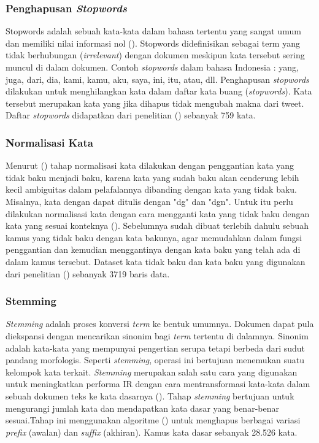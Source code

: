 \subsubsection*{Penghapusan \textit{Stopwords}}

Stopwords adalah sebuah kata-kata dalam bahasa tertentu yang sangat umum dan memiliki nilai informasi nol (\cite{Meyer2008}). Stopwords didefinisikan sebagai term yang tidak berhubungan (\textit{irrelevant}) dengan dokumen meskipun kata tersebut sering muncul di dalam dokumen. Contoh \textit{stopwords} dalam bahasa  Indonesia : yang, juga, dari, dia, kami, kamu, aku, saya, ini, itu, atau, dll.
Penghapusan \textit{stopwords} dilakukan untuk menghilangkan kata dalam daftar kata buang (\textit{stopwords}). Kata tersebut merupakan kata yang jika dihapus tidak mengubah makna dari tweet. Daftar \textit{stopwords} didapatkan dari penelitian \citeauthor{tala2003study} (\cite*{tala2003study}) sebanyak 759 kata.


\subsubsection*{Normalisasi Kata}

Menurut \citeauthor{AZIZ2013} (\cite*{AZIZ2013}) tahap normalisasi kata dilakukan dengan penggantian kata yang tidak baku menjadi baku, karena kata yang sudah baku akan cenderung lebih kecil ambiguitas dalam pelafalannya dibanding dengan kata yang tidak baku. Misalnya, kata dengan dapat ditulis dengan "dg" dan "dgn".  Untuk itu perlu dilakukan normalisasi kata dengan cara mengganti kata yang tidak baku dengan kata yang sesuai konteknya (\cite{journals/csl/SproatBCKOR01}). Sebelumnya sudah dibuat terlebih dahulu sebuah kamus yang tidak baku dengan kata bakunya, agar memudahkan dalam fungsi penggantian dan kemudian menggantinya dengan kata baku yang telah ada di dalam kamus tersebut. Dataset kata tidak baku dan kata baku yang digunakan dari penelitian \citeauthor{AZIZ2013} (\cite*{AZIZ2013}) sebanyak 3719 baris data. 

\subsubsection*{Stemming}

\textit{Stemming} adalah proses konversi \textit{term} ke bentuk  umumnya. Dokumen dapat pula diekspansi dengan mencarikan  sinonim  bagi \textit{term} tertentu di  dalamnya. Sinonim adalah kata-kata yang mempunyai pengertian serupa tetapi berbeda dari sudut pandang morfologis. Seperti \textit{stemming},  operasi ini bertujuan menemukan suatu kelompok kata terkait.
\textit{Stemming} merupakan salah satu cara yang digunakan untuk meningkatkan performa IR dengan cara mentransformasi kata-kata dalam sebuah dokumen teks ke kata dasarnya (\cite{agusta2009}). Tahap \textit{stemming} bertujuan untuk mengurangi jumlah kata dan mendapatkan kata dasar yang benar-benar sesuai.Tahap ini menggunakan algoritme \citeauthor{Adriani:2007:SIC:1316457.1316459} (\cite*{Adriani:2007:SIC:1316457.1316459}) untuk menghapus berbagai variasi \textit{prefix} (awalan) dan \textit{suffix} (akhiran). Kamus kata dasar sebanyak 28.526 kata.

